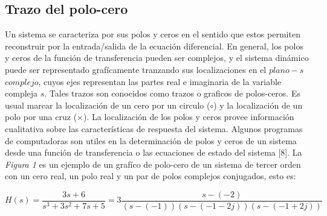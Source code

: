 \documentclass[10pt,a4paper]{article}
\begin{document}
\subsection{Trazo del polo-cero}
Un sistema se caracteriza por sus polos y ceros en el sentido que estos permiten reconstruir por la entrada/salida de la ecuación diferencial. En general, los polos y ceros de la función de transferencia pueden ser complejos, y el sistema dinámico puede ser representado grafícamente tranzando sus localizaciones en el $plano-s $ $complejo$, cuyos ejes representan las partes real e imaginaria de la variable compleja $s$. Tales trazos son conocidos como trazos o graficos de polos-ceros. Es usual marcar la localización de un cero por un circulo ($\circ$) y la localización de un polo por una cruz ($\times$). La localización de los polos y ceros provee información cualitativa sobre las características de respuesta del sistema. Algunos programas de computadoras son utiles en la determinación de polos y ceros de un sistema desde una función de transferencia o las ecuaciones de estado del sistema [8]. La \textit{Figura 1} es un ejemplo de un grafíco de polo-cero de un sistema de tercer orden con un cero real, un polo real y un par de polos complejos conjugados, esto es:
\begin{center}
  \[H(s)=\frac{3s+6}{s^{3}+3s^{2}+7s+5}=3\frac{s-(-2)}{(s-(-1))(s-(-1-2j))(s-(-1+2j))}\]
\end{center}
\end{document}
